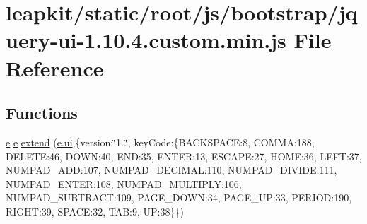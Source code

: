 \hypertarget{static_2root_2js_2bootstrap_2jquery-ui-1_810_84_8custom_8min_8js}{\section{leapkit/static/root/js/bootstrap/jquery-\/ui-\/1.10.4.custom.\-min.\-js File Reference}
\label{static_2root_2js_2bootstrap_2jquery-ui-1_810_84_8custom_8min_8js}
}
\subsection*{Functions}
\begin{DoxyCompactItemize}
\item 
\hyperlink{static_2root_2js_2jquery-ui_8custom_8min_8js_abea95a4e94bc6f4151d5683d4c12c3f4}{e} \hyperlink{static_2root_2js_2jquery-ui_8custom_8min_8js_abea95a4e94bc6f4151d5683d4c12c3f4}{e} \hyperlink{static_2root_2js_2bootstrap_2jquery-ui-1_810_84_8custom_8min_8js_aceeaa2080d5a7df0cc8b259774f5a96a}{extend} (\hyperlink{static_2root_2js_2jquery-ui_8custom_8min_8js_a8ebc3a47bff7b1c2623695f3db4c0761}{e.\-ui},\{version\-:\char`\"{}1..\char`\"{}, key\-Code\-:\{B\-A\-C\-K\-S\-P\-A\-C\-E\-:8, C\-O\-M\-M\-A\-:188, D\-E\-L\-E\-T\-E\-:46, D\-O\-W\-N\-:40, E\-N\-D\-:35, E\-N\-T\-E\-R\-:13, E\-S\-C\-A\-P\-E\-:27, H\-O\-M\-E\-:36, L\-E\-F\-T\-:37, N\-U\-M\-P\-A\-D\-\_\-\-A\-D\-D\-:107, N\-U\-M\-P\-A\-D\-\_\-\-D\-E\-C\-I\-M\-A\-L\-:110, N\-U\-M\-P\-A\-D\-\_\-\-D\-I\-V\-I\-D\-E\-:111, N\-U\-M\-P\-A\-D\-\_\-\-E\-N\-T\-E\-R\-:108, N\-U\-M\-P\-A\-D\-\_\-\-M\-U\-L\-T\-I\-P\-L\-Y\-:106, N\-U\-M\-P\-A\-D\-\_\-\-S\-U\-B\-T\-R\-A\-C\-T\-:109, P\-A\-G\-E\-\_\-\-D\-O\-W\-N\-:34, P\-A\-G\-E\-\_\-\-U\-P\-:33, P\-E\-R\-I\-O\-D\-:190, R\-I\-G\-H\-T\-:39, S\-P\-A\-C\-E\-:32, T\-A\-B\-:9, U\-P\-:38\}\})
\item 

\end{DoxyCompactItemize}
